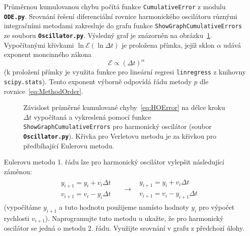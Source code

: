 \documentclass[a4paper,11pt,twoside]{article}
\def\code#1{\textnormal{\texttt{#1}}}
\def\file#1{\textnormal{\textbf{\texttt{#1}}}}
\begin{document}
    \begin{solution}
        Průměrnou kumulovanou chybu počítá funkce \code{CumulativeError} z modulu \file{ODE.py}.
        Srovnání řešení diferenciální rovnice harmonického oscilátoru různými integračními metodami zakresluje do grafu funkce \code{ShowGraphCumulativeErrors} ze souboru \file{Oscillator.py}.
        Výsledný graf je znázorněn na obrázku~\ref{fig:HOError}.
        Vypočítanými křivkami $\ln\mathcal{E}(\ln\Delta t)$ je proložena přímka, jejíž sklon $\alpha$ udává exponent moncinného zákona
        \begin{equation}
            \mathcal{E}\propto\left(\Delta t\right)^{\alpha}
        \end{equation} 
        (k proložení přímky je využita funkce pro lineární regresi \code{linregress} z knihovny \code{scipy.stats}).
        Tento exponent výborně odpovídá řádu metody $p$ dle rovnice~\eqref{eq:MethodOrder}.

        \begin{figure}[!htbp]
            \centering
			\caption{
                \protect\small
                Závislost průměrné kumulované chyby~\eqref{eq:HOError} na délce kroku $\Delta t$ vypočítaná a vykreslená pomocí funkce \code{ShowGraphCumulativeErrors} pro harmonický oscilátor (soubor \file{Oscillator.py}).
                Křivka pro Verletovu metodu je  za křivkou pro předbíhající Eulerovu metodu.
            }	
            \label{fig:HOError}
		\end{figure}
    \end{solution}

    \begin{task}
        Eulerovu metodu 1. řádu lze pro harmonický oscilátor vylepšit následující záměnou:
        \begin{align}
            &\begin{matrix}
                y_{i+1}=y_{i}+v_{i}\Delta t \\
                v_{i+1}=v_{i}-y_{i}\Delta t 
            \end{matrix}
            &&\longrightarrow
            &\begin{matrix}
                y_{i+1}=y_{i}+v_{i}\Delta t \\
                v_{i+1}=v_{i}-y_{i+1}\Delta t 
            \end{matrix}
        \end{align}
        (vypočítáme $y_{i+1}$ a tuto hodnotu použijeme namísto hodnoty $y_{i}$ pro výpočet rychlosti $v_{i+1}$).
        Naprogramujte tuto metodu u ukažte, že pro harmonický oscilátor se jedná o metodu 2. řádu.
        Využijte srovnání v grafu z předchozí úlohy.
    \end{task}
\end{document}
